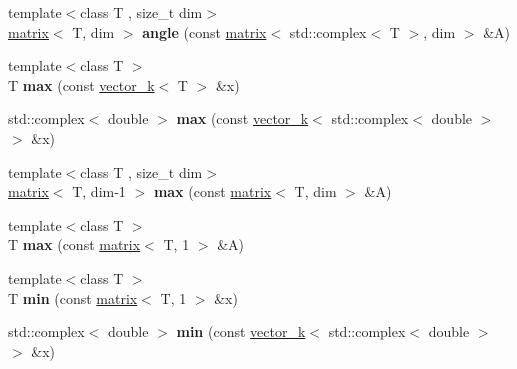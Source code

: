 \begin{DoxyCompactItemize}
\item 
\hypertarget{namespacekeycpp_afbbe373666d686c14e6ce6517d050373}{{\footnotesize template$<$class T , size\-\_\-t dim$>$ }\\\hyperlink{classkeycpp_1_1matrix}{matrix}$<$ T, dim $>$ {\bfseries angle} (const \hyperlink{classkeycpp_1_1matrix}{matrix}$<$ std\-::complex$<$ T $>$, dim $>$ \&A)}\label{namespacekeycpp_afbbe373666d686c14e6ce6517d050373}

\item 
\hypertarget{namespacekeycpp_a5a9aef54bbe0cd6e85d9a41842a57f05}{{\footnotesize template$<$class T $>$ }\\T {\bfseries max} (const \hyperlink{classkeycpp_1_1vector__k}{vector\-\_\-k}$<$ T $>$ \&x)}\label{namespacekeycpp_a5a9aef54bbe0cd6e85d9a41842a57f05}

\item 
\hypertarget{namespacekeycpp_a61e3069eeec7219d10f997367701e488}{std\-::complex$<$ double $>$ {\bfseries max} (const \hyperlink{classkeycpp_1_1vector__k}{vector\-\_\-k}$<$ std\-::complex$<$ double $>$ $>$ \&x)}\label{namespacekeycpp_a61e3069eeec7219d10f997367701e488}

\item 
\hypertarget{namespacekeycpp_abfa0ebe44ce33d380a100f6db8232a2d}{{\footnotesize template$<$class T , size\-\_\-t dim$>$ }\\\hyperlink{classkeycpp_1_1matrix}{matrix}$<$ T, dim-\/1 $>$ {\bfseries max} (const \hyperlink{classkeycpp_1_1matrix}{matrix}$<$ T, dim $>$ \&A)}\label{namespacekeycpp_abfa0ebe44ce33d380a100f6db8232a2d}

\item 
\hypertarget{namespacekeycpp_aa5f79e58739abeaa5e3f7d5c422cc409}{{\footnotesize template$<$class T $>$ }\\T {\bfseries max} (const \hyperlink{classkeycpp_1_1matrix}{matrix}$<$ T, 1 $>$ \&A)}\label{namespacekeycpp_aa5f79e58739abeaa5e3f7d5c422cc409}

\item 
\hypertarget{namespacekeycpp_a9d3aca14baf0d8e395876f286c284bcf}{{\footnotesize template$<$class T $>$ }\\T {\bfseries min} (const \hyperlink{classkeycpp_1_1matrix}{matrix}$<$ T, 1 $>$ \&x)}\label{namespacekeycpp_a9d3aca14baf0d8e395876f286c284bcf}

\item 
\hypertarget{namespacekeycpp_aa56d65d68004f40352c8e33bffb0e0eb}{std\-::complex$<$ double $>$ {\bfseries min} (const \hyperlink{classkeycpp_1_1vector__k}{vector\-\_\-k}$<$ std\-::complex$<$ double $>$ $>$ \&x)}\label{namespacekeycpp_aa56d65d68004f40352c8e33bffb0e0eb}


\end{DoxyCompactItemize}
